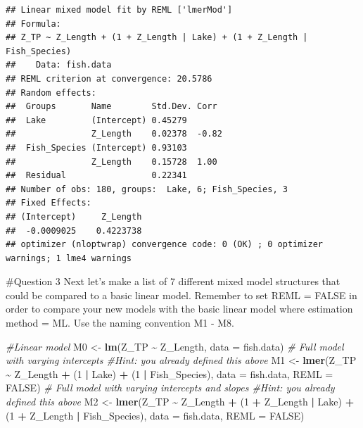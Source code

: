 \documentclass[
]{article}
\newenvironment{Shaded}{\begin{snugshade}}{\end{snugshade}}
\newcommand{\AttributeTok}[1]{\textcolor[rgb]{0.13,0.29,0.53}{#1}}
\newcommand{\CommentTok}[1]{\textcolor[rgb]{0.56,0.35,0.01}{\textit{#1}}}
\newcommand{\ConstantTok}[1]{\textcolor[rgb]{0.56,0.35,0.01}{#1}}
\newcommand{\DecValTok}[1]{\textcolor[rgb]{0.00,0.00,0.81}{#1}}
\newcommand{\FunctionTok}[1]{\textcolor[rgb]{0.13,0.29,0.53}{\textbf{#1}}}
\newcommand{\NormalTok}[1]{#1}
\newcommand{\OtherTok}[1]{\textcolor[rgb]{0.56,0.35,0.01}{#1}}
\newcommand{\SpecialCharTok}[1]{\textcolor[rgb]{0.81,0.36,0.00}{\textbf{#1}}}
\begin{document}
\begin{verbatim}
## Linear mixed model fit by REML ['lmerMod']
## Formula: 
## Z_TP ~ Z_Length + (1 + Z_Length | Lake) + (1 + Z_Length | Fish_Species)
##    Data: fish.data
## REML criterion at convergence: 20.5786
## Random effects:
##  Groups       Name        Std.Dev. Corr 
##  Lake         (Intercept) 0.45279       
##               Z_Length    0.02378  -0.82
##  Fish_Species (Intercept) 0.93103       
##               Z_Length    0.15728  1.00 
##  Residual                 0.22341       
## Number of obs: 180, groups:  Lake, 6; Fish_Species, 3
## Fixed Effects:
## (Intercept)     Z_Length  
##  -0.0009025    0.4223738  
## optimizer (nloptwrap) convergence code: 0 (OK) ; 0 optimizer warnings; 1 lme4 warnings
\end{verbatim}

\#Question 3 Next let's make a list of 7 different mixed model
structures that could be compared to a basic linear model. Remember to
set REML = FALSE in order to compare your new models with the basic
linear model where estimation method = ML. Use the naming convention M1
- M8.

\begin{Shaded}
\begin{Highlighting}[]
\CommentTok{\#Linear model}
\NormalTok{M0 }\OtherTok{\textless{}{-}} \FunctionTok{lm}\NormalTok{(Z\_TP }\SpecialCharTok{\textasciitilde{}}\NormalTok{ Z\_Length, }\AttributeTok{data =}\NormalTok{ fish.data)}
\CommentTok{\# Full model with varying intercepts \#Hint: you already defined this above}
\NormalTok{M1 }\OtherTok{\textless{}{-}} \FunctionTok{lmer}\NormalTok{(Z\_TP }\SpecialCharTok{\textasciitilde{}}\NormalTok{ Z\_Length }\SpecialCharTok{+}\NormalTok{ (}\DecValTok{1} \SpecialCharTok{|}\NormalTok{ Lake) }\SpecialCharTok{+}\NormalTok{ (}\DecValTok{1} \SpecialCharTok{|}\NormalTok{ Fish\_Species),}
     \AttributeTok{data =}\NormalTok{ fish.data, }\AttributeTok{REML =} \ConstantTok{FALSE}\NormalTok{)}
\CommentTok{\# Full model with varying intercepts and slopes \#Hint: you already defined this above}
\NormalTok{M2 }\OtherTok{\textless{}{-}} \FunctionTok{lmer}\NormalTok{(Z\_TP }\SpecialCharTok{\textasciitilde{}}\NormalTok{ Z\_Length }\SpecialCharTok{+}\NormalTok{ (}\DecValTok{1} \SpecialCharTok{+}\NormalTok{ Z\_Length }\SpecialCharTok{|}\NormalTok{ Lake) }\SpecialCharTok{+}\NormalTok{ (}\DecValTok{1} \SpecialCharTok{+}\NormalTok{ Z\_Length }\SpecialCharTok{|}\NormalTok{ Fish\_Species),}
     \AttributeTok{data =}\NormalTok{ fish.data, }\AttributeTok{REML =} \ConstantTok{FALSE}\NormalTok{)}
\end{Highlighting}
\end{Shaded}
\end{document}
